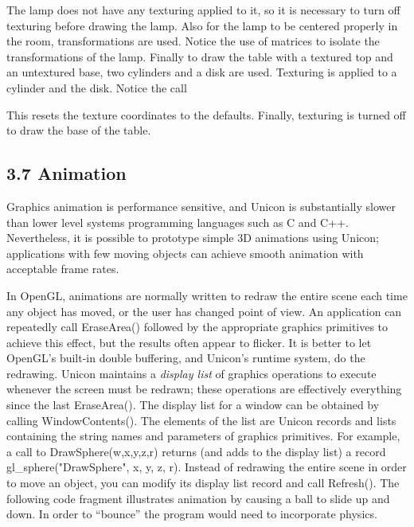 \documentclass[letterpaper]{article}
\begin{document}
{The lamp does not have any texturing applied to it, so it is necessary
to turn off texturing before drawing the lamp.  Also for the lamp to
be centered properly in the room, transformations are used. Notice the
use of matrices to isolate the transformations of the lamp. Finally to
draw the table with a textured top and an untextured base, two
cylinders and a disk are used. Texturing is applied to a cylinder and
the disk. Notice the call


This resets the texture coordinates to the defaults. Finally,
texturing is turned off to draw the base of the table.


\subsection[3.7 Animation]{3.7 Animation}

Graphics animation is performance sensitive, and Unicon is
substantially slower than lower level systems programming languages
such as C and C++. Nevertheless, it is possible to prototype simple 3D
animations using Unicon; applications with few moving objects can
achieve smooth animation with acceptable frame rates.

In OpenGL, animations are normally written to redraw the entire scene
each time any object has moved, or the user has changed point of
view. An application can repeatedly call \textsf{EraseArea()}
followed by the
appropriate graphics primitives to achieve this effect, but the
results often appear to flicker. It is better to let OpenGL's built-in
double buffering, and Unicon's runtime system, do the
redrawing. Unicon maintains a \textit{display list} of graphics
operations to execute whenever the screen must be redrawn; these
operations are effectively everything since the last EraseArea(). The
display list for a window can be obtained by calling
WindowContents(). The elements of the list are Unicon records and
lists containing the string names and parameters of graphics
primitives. For example, a call to \textsf{DrawSphere(w,x,y,z,r)}
returns (and adds to the display list) a record
gl\_sphere("DrawSphere", x, y, z, r). Instead of redrawing the
entire scene in order to move an object,
you can modify its display list record and call \textsf{Refresh()}.  The
following code fragment illustrates animation by causing a ball to
slide up and down. In order to ``bounce'' the program would need to
incorporate physics.

}
\end{document}
